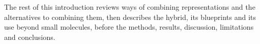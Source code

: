 The rest of this introduction reviews ways of combining representations and the alternatives to combining them, then describes the hybrid, its blueprints and its use beyond small molecules, before the methods, results, discussion, limitations and conclusions.

